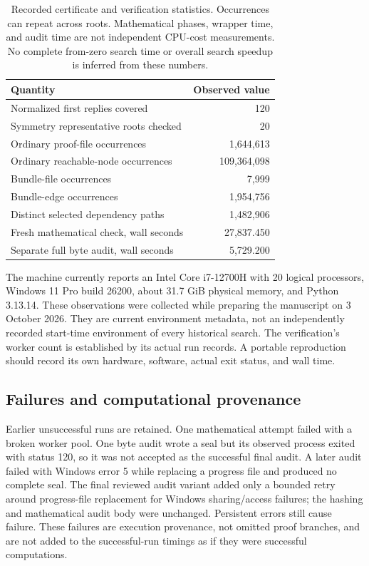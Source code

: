 \documentclass[11pt]{article}
\theoremstyle{definition}
\theoremstyle{remark}
\begin{document}
\begin{table}[ht]
\centering
\begin{tabular}{lr}
\toprule Quantity & Observed value\\\midrule
Normalized first replies covered & 120\\
Symmetry representative roots checked & 20\\
Ordinary proof-file occurrences & 1,644,613\\
Ordinary reachable-node occurrences & 109,364,098\\
Bundle-file occurrences & 7,999\\
Bundle-edge occurrences & 1,954,756\\
Distinct selected dependency paths & 1,482,906\\
Fresh mathematical check, wall seconds & 27,837.450\\
Separate full byte audit, wall seconds & 5,729.200\\
\bottomrule
\end{tabular}
\caption{Recorded certificate and verification statistics. Occurrences can
repeat across roots. Mathematical phases, wrapper time, and audit time
are not independent CPU-cost measurements. No complete from-zero search
time or overall search speedup is inferred from these numbers.}
\label{tab:counts}
\end{table}

The machine currently reports an Intel Core i7-12700H with 20 logical
processors, Windows 11 Pro build 26200, about 31.7 GiB physical memory,
and Python 3.13.14. These observations were collected while preparing the
manuscript on 3 October 2026. They are current environment metadata, not
an independently recorded start-time environment of every historical
search. The verification's worker count is established by its actual run
records. A portable reproduction should record its own hardware, software,
actual exit status, and wall time.

\subsection{Failures and computational provenance}
Earlier unsuccessful runs are retained. One mathematical attempt failed
with a broken worker pool. One byte audit wrote a seal but its observed
process exited with status 120, so it was not accepted as the successful
final audit. A later audit failed with Windows error 5 while replacing a
progress file and produced no complete seal. The final reviewed audit
variant added only a bounded retry around progress-file replacement for
Windows sharing/access failures; the hashing and mathematical audit body
were unchanged. Persistent errors still cause failure. These failures are
execution provenance, not omitted proof branches, and are not added to the
successful-run timings as if they were successful computations.
\end{document}

